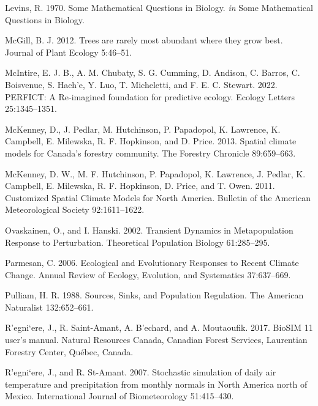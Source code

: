\documentclass[12pt]{article}
\newlength{\cslhangindent}
\newenvironment{cslreferences}%
  {\setlength{\parindent}{0pt}%
  \everypar{\setlength{\hangindent}{\cslhangindent}}\ignorespaces}%
  {\par}
\begin{document}
\begin{cslreferences}
\leavevmode\hypertarget{ref-levins_mathematical_1970}{}%
Levins, R. 1970. Some Mathematical Questions in Biology. \emph{in} Some
Mathematical Questions in Biology.

\leavevmode\hypertarget{ref-mcgill_trees_2012}{}%
McGill, B. J. 2012. Trees are rarely most abundant where they grow best.
Journal of Plant Ecology 5:46--51.

\leavevmode\hypertarget{ref-mcintire_perfict_2022}{}%
McIntire, E. J. B., A. M. Chubaty, S. G. Cumming, D. Andison, C. Barros,
C. Boisvenue, S. Hach\a'e, Y. Luo, T. Micheletti, and F. E. C. Stewart.
2022. PERFICT: A Re‐imagined foundation for predictive ecology. Ecology
Letters 25:1345--1351.

\leavevmode\hypertarget{ref-mckenney_spatial_2013}{}%
McKenney, D., J. Pedlar, M. Hutchinson, P. Papadopol, K. Lawrence, K.
Campbell, E. Milewska, R. F. Hopkinson, and D. Price. 2013. Spatial
climate models for Canada's forestry community. The Forestry Chronicle
89:659--663.

\leavevmode\hypertarget{ref-mckenney_customized_2011}{}%
McKenney, D. W., M. F. Hutchinson, P. Papadopol, K. Lawrence, J. Pedlar,
K. Campbell, E. Milewska, R. F. Hopkinson, D. Price, and T. Owen. 2011.
Customized Spatial Climate Models for North America. Bulletin of the
American Meteorological Society 92:1611--1622.

\leavevmode\hypertarget{ref-ovaskainen_transient_2002}{}%
Ovaskainen, O., and I. Hanski. 2002. Transient Dynamics in
Metapopulation Response to Perturbation. Theoretical Population Biology
61:285--295.

\leavevmode\hypertarget{ref-parmesan_ecological_2006}{}%
Parmesan, C. 2006. Ecological and Evolutionary Responses to Recent
Climate Change. Annual Review of Ecology, Evolution, and Systematics
37:637--669.

\leavevmode\hypertarget{ref-pulliam_sources_1988}{}%
Pulliam, H. R. 1988. Sources, Sinks, and Population Regulation. The
American Naturalist 132:652--661.

\leavevmode\hypertarget{ref-regniere_biosim_2017}{}%
R\a'egni\a`ere, J., R. Saint-Amant, A. B\a'echard, and A. Moutaoufik.
2017. BioSIM 11 user's manual. Natural Resources Canada, Canadian Forest
Services, Laurentian Forestry Center, Québec, Canada.

\leavevmode\hypertarget{ref-regniere_stochastic_2007}{}%
R\a'egni\a`ere, J., and R. St-Amant. 2007. Stochastic simulation of
daily air temperature and precipitation from monthly normals in North
America north of Mexico. International Journal of Biometeorology
51:415--430.


\end{cslreferences}
\end{document}
